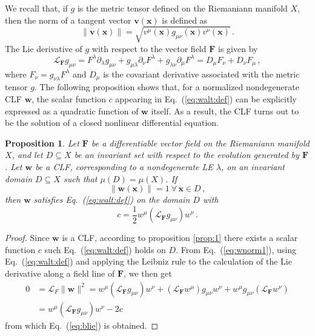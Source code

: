 \documentclass{article}
\theoremstyle{plain}
\newtheorem{proposition}[theorem]{Proposition}
\theoremstyle{definition}
\theoremstyle{remark}
\newcommand{\vect}[1]{\boldsymbol{#1}}
\begin{document}
We recall that,
if $g$ is the metric tensor defined on the Riemaniann manifold $X$, 
then the norm of a tangent vector $\vect{v}(\vect{x})$
is defined as
\begin{equation}\label{eq:normv}
\lVert \vect{v}(\vect{x})\rVert= 
\sqrt{v^\mu(\vect{\vect{x}}) g_{\mu\nu}(\vect{x})v^\nu(\vect{x})}\,.
\end{equation}
The Lie derivative of
$g$ with respect to the vector field $\vect F$ is given by
\[
\mathcal{L}_{\vect{F}} g_{\mu\nu}=F^\lambda \partial_\lambda g_{\mu\nu}
+g_{\mu\lambda}\partial_\nu F^\lambda + g_{\lambda\nu}\partial_\mu F^\lambda
=D_\mu F_\nu + D_\nu F_\mu\,,
\]
where $F_\nu=g_{\nu\lambda}F^\lambda$ and
$D_\mu$ is the covariant derivative associated with the
metric tensor $g$. The following proposition shows that, for a normalized 
nondegenerate CLF $\vect w$, the scalar function $c$ appearing in
Eq.~(\ref{eq:walt:def}) can be explicitly expressed as a quadratic function
of $\vect w$ itself. As a result, the CLF turns out to be the solution of
a closed nonlinear differential equation.

\begin{proposition}\label{prop:blim}
Let $\vect{F}$ be a differentiable vector field on the Riemaniann manifold
$X$, and let $D\subseteq X$ be an invariant set with respect to the evolution
generated by $\vect{F}$. Let $\vect{w}$
be a CLF, corresponding to a nondegenerate LE $\lambda$, on an
invariant domain \mbox{$D\subseteq X$} such that $\mu(D)=\mu(X)$. If
\begin{equation}\label{eq:wnorm1}
\lVert \vect{w}(\vect{x})\rVert=1 \ \forall\,\vect{x}\in D\,,
\end{equation}
then $\vect w$
satisfies Eq.~(\ref{eq:walt:def}) on the domain $D$ with 
\begin{equation}\label{eq:blie}
c= \frac 12
w^\mu \left(\mathcal{L}_{\vect{F}} g_{\mu\nu}\right) w^\nu\,.
\end{equation}
\end{proposition}

\begin{proof}
Since $\vect{w}$ is a CLF,
according to proposition \ref{prop:1} there exists a scalar function
$c$ such Eq.~(\ref{eq:walt:def}) holds on $D$.
From Eq.~(\ref{eq:wnorm1}), using Eq.~(\ref{eq:walt:def}) and
applying the Leibniz rule to the calculation of the Lie derivative along a
field line of $\vect{F}$, we then get
\begin{align*}
0&=\mathcal{L}_F \lVert \vect{w}\rVert^2= 
w^\mu \left(\mathcal{L}_{\vect{F}} g_{\mu\nu}\right) w^\nu 
+\left(\mathcal{L}_{\vect{F}} w^\mu\right) g_{\mu\nu} w^\nu +
w^\mu g_{\mu\nu} \left(\mathcal{L}_{\vect{F}} w^\nu\right)\\
&= w^\mu \left(\mathcal{L}_{\vect{F}} g_{\mu\nu}\right) w^\nu- 2c
\end{align*}
from which Eq.~(\ref{eq:blie}) is obtained.
\end{proof}
\end{document}
